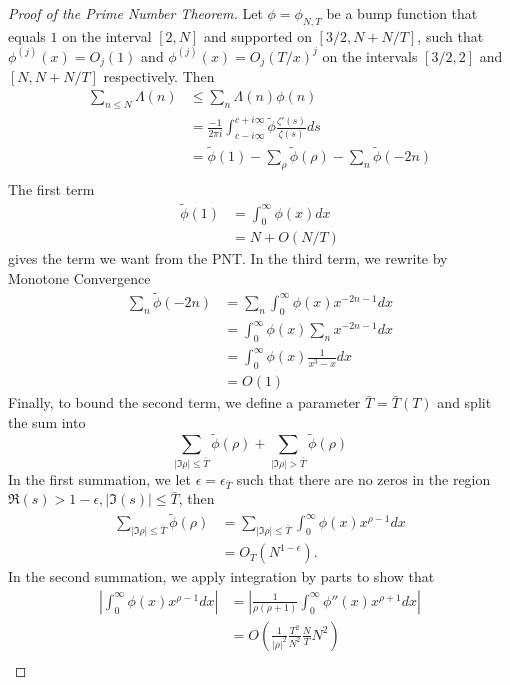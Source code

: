 \begin{proof}[Proof of the Prime Number Theorem]
Let $\phi=\phi_{N,T}$ be a bump function that equals $1$ on the interval $[2,N]$ and supported on $[3/2, N+N/T]$, such that $\phi^{(j)}(x)=O_j(1)$ and $\phi^{(j)}(x)=O_j(T/x)^j$ on the intervals $[3/2, 2]$ and $[N,N+N/T]$ respectively.
Then \begin{align*}
    \sum_{n\leq N}\Lambda(n) &\leq \sum_{n} \Lambda(n)\phi(n)\\
    &= \frac{-1}{2\pi i}\int_{c-i\infty}^{c+i\infty}\tilde{\phi}\frac{\zeta'(s)}{\zeta(s)}ds\\
    &= \tilde{\phi}(1) - \sum_{\rho} \tilde{\phi}(\rho) - \sum_{n} \tilde{\phi}(-2n)\\
\end{align*}
The first term \begin{align*}
    \tilde{\phi}(1) &= \int_{0}^{\infty} \phi(x) dx \\
    &= N+ O(N/T) 
\end{align*}
gives the term we want from the PNT. In the third term, we rewrite by Monotone Convergence \begin{align*}
    \sum_{n} \tilde{\phi}(-2n) &= \sum_{n} \int_{0}^{\infty} \phi(x) x^{-2n-1} dx \\
    &=\int_{0}^{\infty} \phi(x) \sum_{n} x^{-2n-1} dx \\
    &= \int_{0}^{\infty} \phi(x) \frac{1}{x^3-x} dx \\
    &= O(1)
\end{align*} 
Finally, to bound the second term, we define a parameter $\bar{T} = \bar{T}(T)$ and split the sum into\[
\sum_{|\Im{\rho}|\leq \bar{T}}\tilde{\phi}(\rho) + \sum_{|\Im{\rho}| > \bar{T}}\tilde{\phi}(\rho)
\]
In the first summation, we let $\epsilon = \epsilon_{\bar{T}}$ 
such that there are no zeros in the region
$\Re({s})>1-\epsilon, |\Im{(s)}|\leq \bar{T}$, then \begin{align*}
    \sum_{|\Im{\rho}|\leq \bar{T}}\tilde{\phi}(\rho) &= \sum_{|\Im{\rho}|\leq \bar{T}} \int_{0}^{\infty}\phi(x)x^{\rho-1}dx\\
    &= O_{T}(N^{1-\epsilon}).
\end{align*}
In the second summation, we apply integration by parts to show that \begin{align*}
    \left|\int_{0}^{\infty}\phi(x)x^{\rho-1}dx\right| &= \left|\frac{1}{\rho(\rho+1)}\int_{0}^{\infty}\phi''(x)x^{\rho+1}dx\right|\\
    &= O\left(\frac{1}{|\rho|^2} \frac{T^2}{N^2} \frac{N}{T} N^2\right)\\

\end{align*}
\end{proof}
